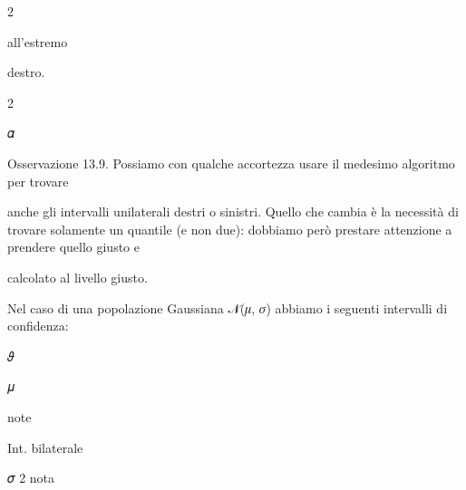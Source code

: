 \documentclass[a4paper,portrait,12pt]{article}
\begin{document}
2


\begin{flushleft}
all'estremo
\end{flushleft}


\begin{flushleft}
destro.
\end{flushleft}


2


\begin{flushleft}
𝛼
\end{flushleft}





\begin{flushleft}
Osservazione 13.9. Possiamo con qualche accortezza usare il medesimo algoritmo per trovare
\end{flushleft}


\begin{flushleft}
anche gli intervalli unilaterali destri o sinistri. Quello che cambia \`{e} la necessit\`{a} di trovare solamente un quantile (e non due): dobbiamo per\`{o} prestare attenzione a prendere quello giusto e
\end{flushleft}


\begin{flushleft}
calcolato al livello giusto.
\end{flushleft}


\begin{flushleft}
Nel caso di una popolazione Gaussiana 𝒩(𝜇, 𝜎) abbiamo i seguenti intervalli di confidenza:
\end{flushleft}


\begin{flushleft}
𝜗
\end{flushleft}


\begin{flushleft}
𝜇
\end{flushleft}





\begin{flushleft}
note
\end{flushleft}





\begin{flushleft}
Int. bilaterale
\end{flushleft}





\begin{flushleft}
𝜎 2 nota
\end{flushleft}
\end{document}
